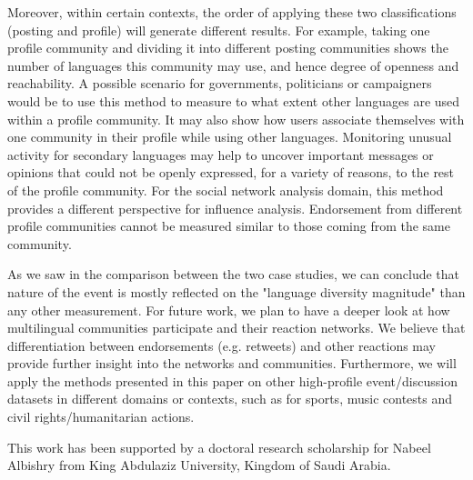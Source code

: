 Moreover, within certain contexts, the order of applying these two
classifications (posting and profile) will generate different results.
For example, taking one profile community and dividing it into
different posting communities shows the number of languages this
community may use, and hence degree of openness and reachability. A
possible scenario for governments, politicians or campaigners would be
to use this method to measure to what extent other languages are used
within a profile community. It may also show how users associate
themselves with one community in their profile while using other
languages. Monitoring unusual activity for secondary languages may
help to uncover important messages or opinions that could not be
openly expressed, for a variety of reasons, to the rest of the profile
community. For the social network analysis domain, this method
provides a different perspective for influence analysis. Endorsement
from different profile communities cannot be measured similar to those
coming from the same community.

As we saw in the comparison between the two case studies, we can conclude that 
nature of the event is mostly reflected on the "language diversity magnitude" than any other measurement. 
For future work, we plan to have a deeper look at how multilingual
communities participate and their reaction networks. We believe that
differentiation between endorsements (e.g. retweets) and other
reactions may provide further insight into the networks and
communities. Furthermore, we will apply the methods presented in this
paper on other high-profile event/discussion datasets in different
domains or contexts, such as for sports, music contests and civil
rights/humanitarian actions.



\begin{acks}
This work has been supported by a doctoral research scholarship for
Nabeel Albishry from King Abdulaziz University, Kingdom of Saudi
Arabia.
\end{acks}
